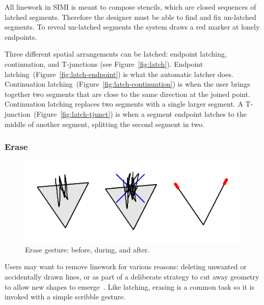 \documentclass{article}
\begin{document}
All linework in SIMI is meant to compose stencils, which are closed
sequences of latched segments. Therefore the designer must be able to
find and fix un-latched segments. To reveal un-latched segments the
system draws a red marker at lonely endpoints.

Three different spatial arrangements can be latched: endpoint
latching, continuation, and T-junctions (see
Figure~\ref{fig:latch}). Endpoint
latching~(Figure~\ref{fig:latch-endpoint}) is what the automatic
latcher does. Continuation
latching~(Figure~\ref{fig:latch-continuation}) is when the user brings
together two segments that are close to the same direction at the
joined point. Continuation latching replaces two segments with a
single larger segment. A T-junction~(Figure~\ref{fig:latch-tjunct}) is
when a segment endpoint latches to the middle of another segment,
splitting the second segment in two.

\subsubsection{Erase}

\begin{figure}[h]
  \centering
  \includegraphics[width=0.9\linewidth]{img/erase-all.pdf}
  \caption{Erase gesture: before, during, and after.}
  \label{fig:erase}
\end{figure}

Users may want to remove linework for various reasons: deleting
unwanted or accidentally drawn lines, or as part of a deliberate
strategy to cut away geometry to allow new shapes to
emerge~\cite{zeleznik-lineogrammer}. Like latching, erasing is a
common task so it is invoked with a simple scribble gesture. 

\end{document}

